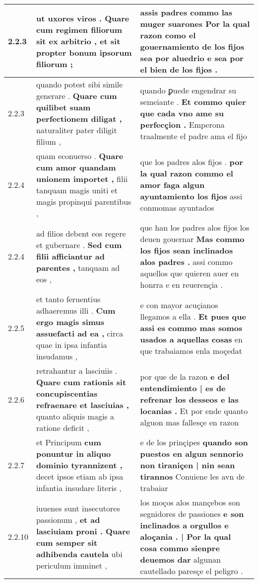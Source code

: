 \begin{tabular}{|p{1cm}|p{6.5cm}|p{6.5cm}|}
2.2.3 & ut uxores viros . \textbf{ Quare cum regimen filiorum sit ex arbitrio , } et sit propter bonum ipsorum filiorum ; & assis padres \textbf{ commo las muger suarones Por la qual razon como el gouernamiento de los fijos } sea por aluedrio e sea por el bien de los fijos . \\\hline
2.2.3 & quando potest sibi simile generare . \textbf{ Quare cum quilibet suam perfectionem diligat , } naturaliter pater diligit filium , & quando ꝑuede engendrar su semeiante . \textbf{ Et commo quier que cada vno ame su perfecçion . } Emperona traalmente el padre ama el fijo \\\hline
2.2.4 & quam econuerso . \textbf{ Quare cum amor quandam unionem importet , } filii tanquam magis uniti et magis propinqui parentibus , & que los padres alos fijos . \textbf{ por la qual razon commo el amor faga algun ayuntamiento los fijos } assi conmomas ayuntados \\\hline
2.2.4 & ad filios debent eos regere et gubernare . \textbf{ Sed cum filii afficiantur ad parentes , } tanquam ad eos , & que han los padres alos fijos los deuen gouernar \textbf{ Mas commo los fijos sean inclinados alos padres . } assi commo aquellos que quieren auer en honrra e en reuerençia . \\\hline
2.2.5 & et tanto feruentius adhaeremus illi . \textbf{ Cum ergo magis simus assuefacti ad ea , } circa quae in ipsa infantia insudamus , & e con mayor acuçianos llegamos a ella . \textbf{ Et pues que assi es commo mas somos usados a aquellas cosas } en que trabaiamos enla moçedat \\\hline
2.2.6 & retrahantur a lasciuiis . \textbf{ Quare cum rationis sit concupiscentias refraenare et lasciuias , } quanto aliquis magis a ratione deficit , & por que de la razon \textbf{ e del entendimiento | es de refrenar los desseos e las locanias . } Et por ende quanto alguon mas fallesçe en razon \\\hline
2.2.7 & et Principum \textbf{ cum ponuntur in aliquo dominio tyrannizent , } decet ipsos etiam ab ipsa infantia insudare literis , & e de los prinçipes \textbf{ quando son puestos en algun sennorio non tiraniçen | nin sean tirannos } Conuiene les avn de trabaiar \\\hline
2.2.10 & iuuenes sunt insecutores passionum , \textbf{ et ad lasciuiam proni . Quare cum semper sit adhibenda cautela } ubi periculum imminet , & los moços alos mançebos son segnidores de passiones \textbf{ e son inclinados a orgullos e aloçania . | Por la qual cosa commo sienpre deuemos dar } algunan cautellado paresçe el peligro . \\\hline

\end{tabular}
